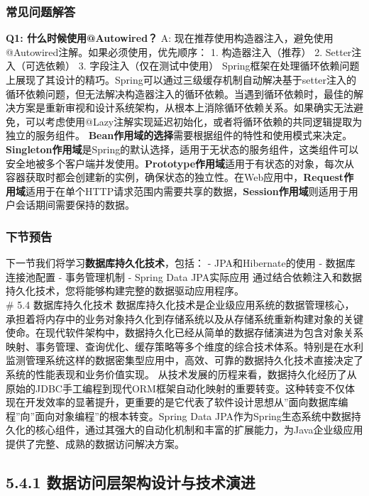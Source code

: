 \subsubsection{常见问题解答}\label{ux5e38ux89c1ux95eeux9898ux89e3ux7b54-1} \textbf{Q1: 什么时候使用@Autowired？} A:
现在推荐使用构造器注入，避免使用@Autowired注解。如果必须使用，优先顺序： 1. 构造器注入（推荐） 2. Setter注入（可选依赖） 3. 字段注入（仅在测试中使用）
Spring框架在处理循环依赖问题上展现了其设计的精巧。Spring可以通过三级缓存机制自动解决基于setter注入的循环依赖问题，但无法解决构造器注入的循环依赖。当遇到循环依赖时，最佳的解决方案是重新审视和设计系统架构，从根本上消除循环依赖关系。如果确实无法避免，可以考虑使用@Lazy注解实现延迟初始化，或者将循环依赖的共同逻辑提取为独立的服务组件。
\textbf{Bean作用域的选择}需要根据组件的特性和使用模式来决定。\textbf{Singleton作用域}是Spring的默认选择，适用于无状态的服务组件，这类组件可以安全地被多个客户端并发使用。\textbf{Prototype作用域}适用于有状态的对象，每次从容器获取时都会创建新的实例，确保状态的独立性。在Web应用中，\textbf{Request作用域}适用于在单个HTTP请求范围内需要共享的数据，\textbf{Session作用域}则适用于用户会话期间需要保持的数据。
\subsubsection{下节预告}\label{ux4e0bux8282ux9884ux544a-2} 下一节我们将学习\textbf{数据库持久化技术}，包括： - JPA和Hibernate的使用 - 数据库连接池配置 -
事务管理机制 - Spring Data JPA实际应用 通过结合依赖注入和数据持久化技术，您将能够构建完整的数据驱动应用程序。 \\\# 5.4 数据库持久化技术
数据库持久化技术是企业级应用系统的数据管理核心，承担着将内存中的业务对象持久化到存储系统以及从存储系统重新构建对象的关键使命。在现代软件架构中，数据持久化已经从简单的数据存储演进为包含对象关系映射、事务管理、查询优化、缓存策略等多个维度的综合技术体系。特别是在水利监测管理系统这样的数据密集型应用中，高效、可靠的数据持久化技术直接决定了系统的性能表现和业务价值实现。
从技术发展的历程来看，数据持久化经历了从原始的JDBC手工编程到现代ORM框架自动化映射的重要转变。这种转变不仅体现在开发效率的显著提升，更重要的是它代表了软件设计思想从''面向数据库编程''向''面向对象编程''的根本转变。Spring
Data JPA作为Spring生态系统中数据持久化的核心组件，通过其强大的自动化机制和丰富的扩展能力，为Java企业级应用提供了完整、成熟的数据访问解决方案。 \subsection{5.4.1
数据访问层架构设计与技术演进}\label{ux6570ux636eux8bbfux95eeux5c42ux67b6ux6784ux8bbeux8ba1ux4e0eux6280ux672fux6f14ux8fdb}
